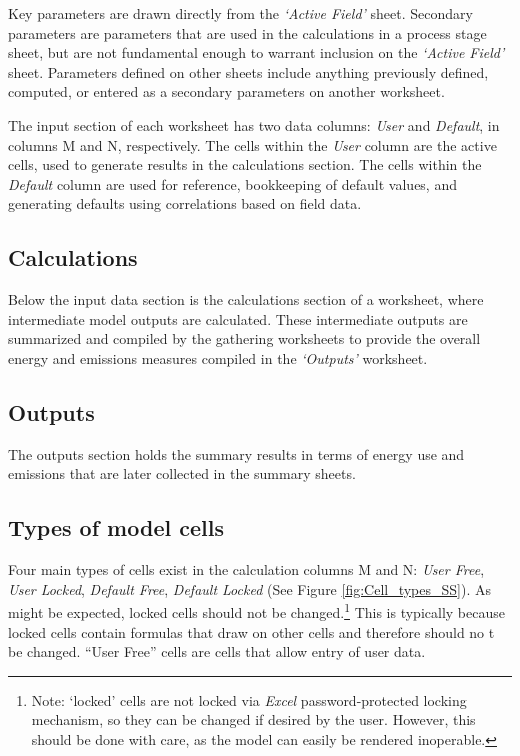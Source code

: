 \documentclass[11pt]{report}
\newcommand{\sheet}[1]{\textit{`{#1}'}}
\begin{document}
Key parameters are drawn directly from the \sheet{Active Field} sheet.  Secondary parameters are parameters that are used in the calculations in a process stage sheet, but are not fundamental enough to warrant inclusion on the \sheet{Active Field} sheet.  Parameters defined on other sheets include anything previously defined, computed, or entered as a secondary parameters on another worksheet.

The input section of each worksheet has two data columns: \emph{User} and \emph{Default}, in columns M and N, respectively. The cells within the \emph{User} column are the active cells, used to generate results in the calculations section. The cells within the \emph{Default} column are used for reference, bookkeeping of default values, and generating defaults using correlations based on field data. 

\subsection{Calculations}
Below the input data section is the calculations section of a worksheet, where intermediate model outputs are calculated. These intermediate outputs are summarized and compiled by the gathering worksheets to provide the overall energy and emissions measures compiled in the \sheet{Outputs} worksheet.

\subsection{Outputs}
The outputs section holds the summary results in terms of energy use and emissions that are later collected in the summary sheets.


\subsection{Types of model cells}
Four main types of cells exist in the calculation columns M and N: \emph{User Free}, \emph{User Locked}, \emph{Default Free}, \emph{Default Locked} (See Figure \ref{fig:Cell_types_SS}). As might be expected, locked cells should not be changed.\footnote{Note: `locked' cells are not locked via \emph{Excel} password-protected locking mechanism, so they can be changed if desired by the user. However, this should be done with care, as the model can easily be rendered inoperable.} This is typically because locked cells contain formulas that draw on other cells and therefore should no t be changed. ``User Free'' cells are cells that allow entry of user data. 
\end{document}
